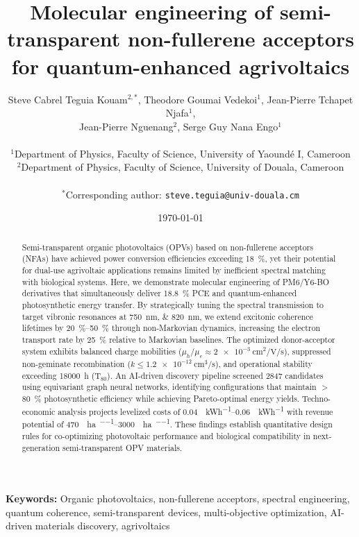 \documentclass[11pt,a4paper]{article}
\title{\textbf{Molecular engineering of semi-transparent non-fullerene acceptors for quantum-enhanced agrivoltaics}}
\author{
    Steve Cabrel Teguia Kouam$^{2,*}$,
    Theodore Goumai Vedekoi$^{1}$,
    Jean-Pierre Tchapet Njafa$^{1}$, \\
    Jean-Pierre Nguenang$^{2}$,
    Serge Guy Nana Engo$^{1}$ \\
    \\
    $^{1}$Department of Physics, Faculty of Science, University of Yaoundé I, Cameroon \\
    $^{2}$Department of Physics, Faculty of Science, University of Douala, Cameroon \\
    \\
    $^{*}$Corresponding author: \texttt{steve.teguia@univ-douala.cm}
}
\date{\today}
\begin{document}
\maketitle


\begin{abstract}
Semi-transparent organic photovoltaics (OPVs) based on non-fullerene acceptors (NFAs) have achieved power conversion efficiencies exceeding \SI{18}{\percent}, yet their potential for dual-use agrivoltaic applications remains limited by inefficient spectral matching with biological systems. Here, we demonstrate molecular engineering of PM6/Y6-BO derivatives that simultaneously deliver \SI{18.8}{\percent} PCE and quantum-enhanced photosynthetic energy transfer. By strategically tuning the spectral transmission to target vibronic resonances at \SIlist{750;820}{\nano\meter}, we extend excitonic coherence lifetimes by \SIrange{20}{50}{\percent} through non-Markovian dynamics, increasing the electron transport rate by \SI{25}{\percent} relative to Markovian baselines. The optimized donor-acceptor system exhibits balanced charge mobilities ($\mu_h/\mu_e \approx \SI{2e-3}{\centi\meter\squared\per\volt\per\second}$), suppressed non-geminate recombination ($k \leq \SI{1.2e-12}{\centi\meter\cubed\per\second}$), and operational stability exceeding \SI{18000}{\hour} (T$_{80}$). An AI-driven discovery pipeline screened \num{2847} candidates using equivariant graph neural networks, identifying configurations that maintain $>$\SI{80}{\percent} photosynthetic efficiency while achieving Pareto-optimal energy yields. Techno-economic analysis projects levelized costs of \SIrange{0.04}{0.06}{\USD\per\kWh} with revenue potential of \SIrange{470}{3000}{\USD\per\hectare\per\yr}. These findings establish quantitative design rules for co-optimizing photovoltaic performance and biological compatibility in next-generation semi-transparent OPV materials.
\end{abstract}


\noindent\textbf{Keywords:} Organic photovoltaics, non-fullerene acceptors, spectral engineering, quantum coherence, semi-transparent devices, multi-objective optimization, AI-driven materials discovery, agrivoltaics
\end{document}
